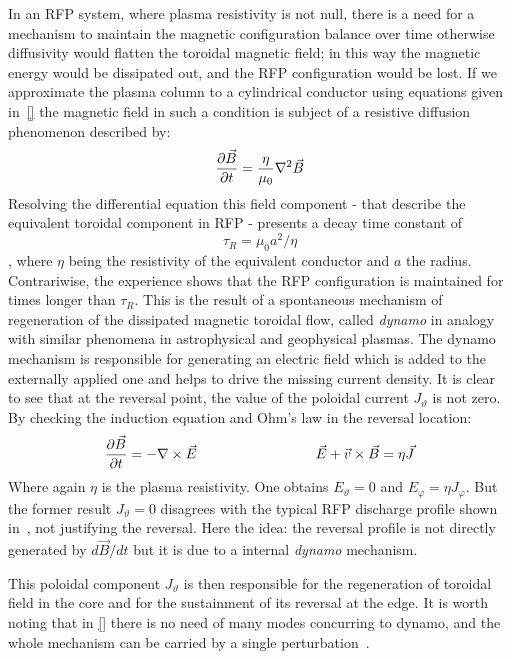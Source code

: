 In an RFP system, where plasma resistivity is not null, there is a need for a mechanism to maintain the magnetic configuration balance over time otherwise diffusivity would flatten the toroidal magnetic field; in this way the magnetic energy would be dissipated out, and the RFP configuration would be lost.
If we approximate the plasma column to a cylindrical conductor using equations given in~\eqref{} the magnetic field in such a condition is subject of a resistive diffusion phenomenon described by:
\begin{equation}
    \pdv{\Vec{B}}{t} = \frac{\eta}{\mu_0} \nabla^2 \Vec{B}
\end{equation}
Resolving the differential equation this field component - that describe the equivalent toroidal component in RFP - presents a decay time constant of $$\tau_R = \mu_0 a^2 / \eta$$, where $\eta$ being the resistivity of the equivalent conductor and $a$ the radius.
Contrariwise, the experience shows that the RFP configuration is maintained for times longer than $\tau_R$. This is the result of a spontaneous mechanism of regeneration of the dissipated magnetic toroidal flow, called \textit{dynamo} in analogy with similar phenomena in astrophysical and geophysical plasmas. The dynamo mechanism is responsible for generating an electric field which is added to the externally applied one and helps to drive the missing current density. 
It is clear to see that at the reversal point, the value of the poloidal current $J_\vartheta$ is not zero. By checking the induction equation and Ohm’s law in the reversal location:
\begin{equation*}
    \pdv{\Vec{B}}{t} = - \nabla \times \Vec{E}  \hspace{3cm} \Vec{E} + \Vec{v} \times \Vec{B} = \eta \Vec{J}
\end{equation*}
Where again $\eta$ is the plasma resistivity. One obtains $E_\vartheta = 0$ and $E_\varphi = \eta J_\varphi$. But the former
result $J_\vartheta = 0$ disagrees with the typical RFP discharge profile shown in~\Figure{\ref{}}, not justifying the reversal.
Here the idea: the reversal profile is not directly generated by $d\Vec{B}/dt$ but it is due to a internal \textit{dynamo} mechanism.

This poloidal component $J_\vartheta$ is then responsible for the regeneration of toroidal
field in the core and for the sustainment of its reversal at the edge. It is worth
noting that in \eqref{} there is no need of many modes concurring to dynamo, and the
whole mechanism can be carried by a single perturbation~\cite{Bonomo39}.


